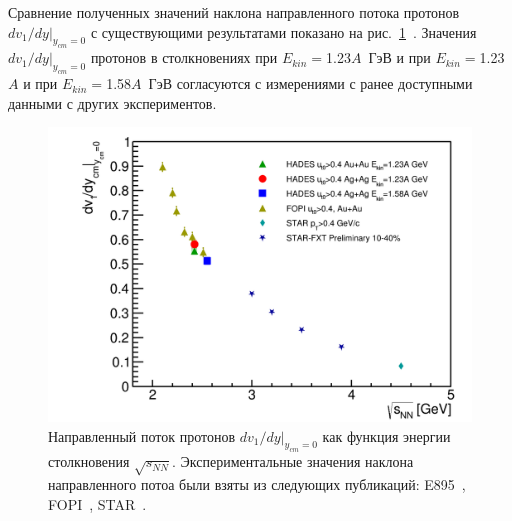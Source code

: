 Сравнение полученных значений наклона направленного потока протонов $dv_1/dy|_{y_{cm}=0}$ с существующими результатами показано на рис.~\ref{fig:hades_dv1_dy_sqrt_snn}~\cite{Mamaev:2024-1}.
Значения $dv_1/dy|_{y_{cm}=0}$ протонов в столкновениях \au{} при $E_{kin}=$1.23$A$~ГэВ и \ag{} при $E_{kin}=$1.23$A$ и  при $E_{kin}=$1.58$A$~ГэВ согласуются с измерениями с ранее доступными данными с других экспериментов.
%
\begin{figure}[ht]
\begin{center}
\includegraphics[width=0.9\linewidth]{images/dv1_dy_sqrt_snn.png}
\caption{ 
    Направленный поток протонов $dv_1/dy|_{y_{cm}=0}$ как функция энергии столкновения $\sqrt{s_{NN}}$. Экспериментальные значения наклона направленного потоа были взяты из следующих публикаций: E895~\cite{E895:2000maf}, FOPI~\cite{FOPI:2011aa}, STAR~\cite{STAR:2020dav}.
}
\label{fig:hades_dv1_dy_sqrt_snn}
\end{center}
\end{figure}